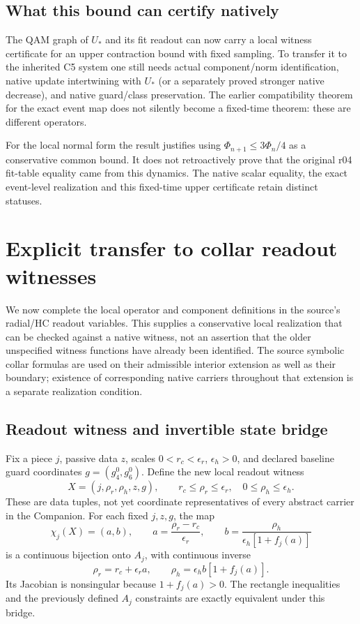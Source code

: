 \documentclass[11pt,a4paper]{article}
\begin{document}
\subsection{What this bound can certify natively}
The QAM graph of $U_*$ and its fit readout can now carry a local witness
certificate for an upper contraction bound with fixed sampling. To transfer
it to the inherited C5 system one still needs actual component/norm
identification, native update intertwining with $U_*$ (or a separately
proved stronger native decrease), and native guard/class preservation.
The earlier compatibility theorem for the exact event map does not silently
become a fixed-time theorem: these are different operators.

For the local normal form the result justifies using
$\Phi_{n+1}\le3\Phi_n/4$ as a conservative common bound. It does not
retroactively prove that the original r04 fit-table equality came from
this dynamics. The native scalar equality, the exact event-level
realization and this fixed-time upper certificate retain distinct statuses.

\section{Explicit transfer to collar readout witnesses}
\label{sec:explicit-readout-transfer}
We now complete the local operator and component definitions in the source's
radial/HC readout variables. This supplies a conservative local realization
that can be checked against a native witness, not an assertion that the
older unspecified witness functions have already been identified.
The source symbolic collar formulas are used on their admissible interior
extension as well as their boundary; existence of corresponding native
carriers throughout that extension is a separate realization condition.

\subsection{Readout witness and invertible state bridge}
Fix a piece $j$, passive data $z$, scales $0<r_c<\epsilon_r$,
$\epsilon_h>0$, and declared baseline guard coordinates $g=(g_4^0,g_6^0)$.
Define the new local readout witness
\[
X=(j,\rho_r,\rho_h,z,g),\qquad
r_c\le\rho_r\le\epsilon_r,\quad0\le\rho_h\le\epsilon_h.
\]
These are data tuples, not yet coordinate representatives of every abstract
carrier in the Companion. For each fixed $j,z,g$, the map
\[
\chi_j(X)=(a,b),\qquad
a=\frac{\rho_r-r_c}{\epsilon_r},\qquad
b=\frac{\rho_h}{\epsilon_h[1+f_j(a)]}
\]
is a continuous bijection onto $A_j$, with continuous inverse
\[
\rho_r=r_c+\epsilon_r a,\qquad
\rho_h=\epsilon_h b[1+f_j(a)].
\]
Its Jacobian is nonsingular because $1+f_j(a)>0$.
The rectangle inequalities and the previously defined $A_j$ constraints
are exactly equivalent under this bridge.
\end{document}

